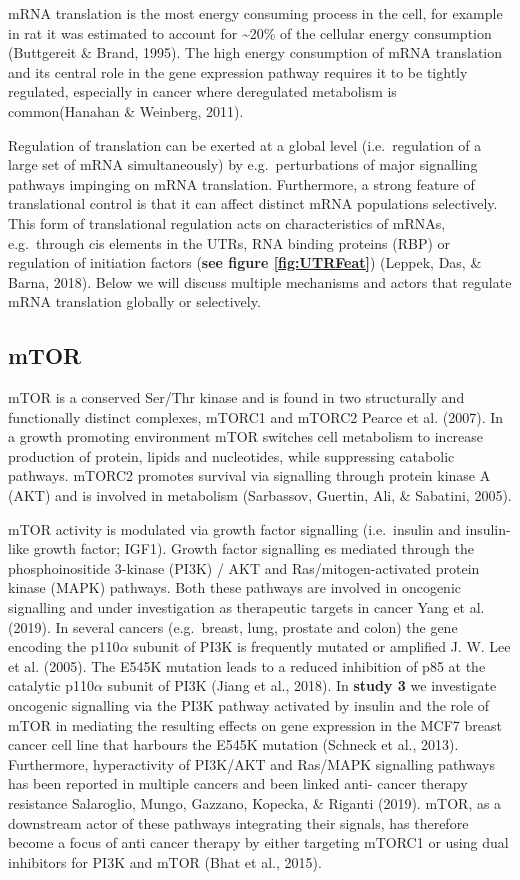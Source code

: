 \documentclass[
  12pt,
  openany]{book}
\begin{document}
mRNA translation is the most energy consuming process in the cell, for example in rat it was estimated to account for \textasciitilde20\% of the cellular energy consumption (Buttgereit \& Brand, 1995). The high energy consumption of mRNA translation and its central role in the gene expression pathway requires it to be tightly regulated, especially in cancer where deregulated metabolism is common(Hanahan \& Weinberg, 2011).

Regulation of translation can be exerted at a global level (i.e.~regulation of a large set of mRNA simultaneously) by e.g.~perturbations of major signalling pathways impinging on mRNA translation. Furthermore, a strong feature of translational control is that it can affect distinct mRNA populations selectively. This form of translational regulation acts on characteristics of mRNAs, e.g.~through cis elements in the UTRs, RNA binding proteins (RBP) or regulation of initiation factors (\textbf{see figure \ref{fig:UTRFeat}}) (Leppek, Das, \& Barna, 2018). Below we will discuss multiple mechanisms and actors that regulate mRNA translation globally or selectively.

\subsection{mTOR} \label{mTOR}

mTOR is a conserved Ser/Thr kinase and is found in two structurally and functionally distinct complexes, mTORC1 and mTORC2 Pearce et al. (2007). In a growth promoting environment mTOR switches cell metabolism to increase production of protein, lipids and nucleotides, while suppressing catabolic pathways. mTORC2 promotes survival via signalling through protein kinase A (AKT) and is involved in metabolism (Sarbassov, Guertin, Ali, \& Sabatini, 2005).

mTOR activity is modulated via growth factor signalling (i.e.~insulin and insulin-like growth factor; IGF1). Growth factor signalling es mediated through the phosphoinositide 3-kinase (PI3K) / AKT and Ras/mitogen-activated protein kinase (MAPK) pathways. Both these pathways are involved in oncogenic signalling and under investigation as therapeutic targets in cancer Yang et al. (2019). In several cancers (e.g.~breast, lung, prostate and colon) the gene encoding the p110\(\alpha\) subunit of PI3K is frequently mutated or amplified J. W. Lee et al. (2005). The E545K mutation leads to a reduced inhibition of p85 at the catalytic p110\(\alpha\) subunit of PI3K (Jiang et al., 2018). In \textbf{study 3} we investigate oncogenic signalling via the PI3K pathway activated by insulin and the role of mTOR in mediating the resulting effects on gene expression in the MCF7 breast cancer cell line that harbours the E545K mutation (Schneck et al., 2013). Furthermore, hyperactivity of PI3K/AKT and Ras/MAPK signalling pathways has been reported in multiple cancers and been linked anti- cancer therapy resistance Salaroglio, Mungo, Gazzano, Kopecka, \& Riganti (2019). mTOR, as a downstream actor of these pathways integrating their signals, has therefore become a focus of anti cancer therapy by either targeting mTORC1 or using dual inhibitors for PI3K and mTOR (Bhat et al., 2015).
\end{document}
